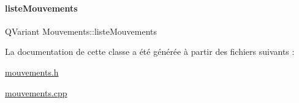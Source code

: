 \paragraph{\texorpdfstring{liste\+Mouvements}{listeMouvements}}
{\footnotesize\ttfamily Q\+Variant Mouvements\+::liste\+Mouvements\hspace{0.3cm}{\ttfamily [read]}}



La documentation de cette classe a été générée à partir des fichiers suivants \+:\begin{DoxyCompactItemize}
\item 
\hyperlink{mouvements_8h}{mouvements.\+h}\item 
\hyperlink{mouvements_8cpp}{mouvements.\+cpp}\end{DoxyCompactItemize}
